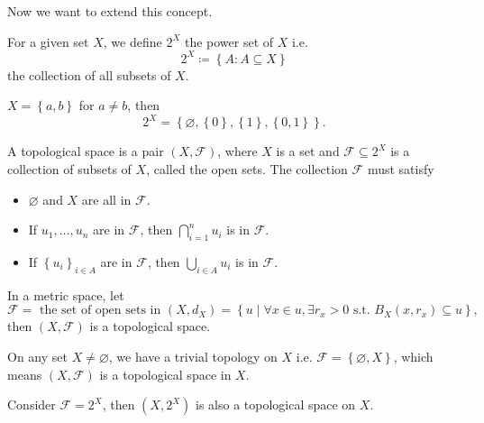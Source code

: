 Now we want to extend this concept. 
\begin{definition} \label{def: power sets}
    For a given set \(X\), we define \(2^X\) the power set of \(X\) i.e. 
    \[
        2^X \coloneqq \left\{ A:A\subseteq X \right\} 
    \] the collection of all subsets of \(X\). 
\end{definition}

\begin{eg}
    \(X = \left\{ a, b \right\} \) for \(a \neq b\), then 
    \[
        2^X = \left\{ \varnothing , \left\{ 0 \right\}, \left\{ 1 \right\}, \left\{ 0, 1 \right\}    \right\}. 
    \]  
\end{eg}

\begin{definition} \label{def: topological space}
    A topological space is a pair \(\left( X, \mathcal{F}  \right) \), where \(X\) is a set and \(\mathcal{F} \subseteq 2^X \) is a collection of subsets of \(X\), called the open sets. The collection \(\mathcal{F} \) must satisfy 
    \begin{itemize}
        \item \(\varnothing  \) and \(X\) are all in \(\mathcal{F} \). 
        \item  If \(u_1, \dots , u_n\) are in \(\mathcal{F} \), then \(\bigcap_{i=1}^{n} u_i \) is in \(\mathcal{F} \). 
        \item If \(\left\{ u_i \right\}_{i \in A} \) are in \(\mathcal{F} \), then \(\bigcup_{i \in A} u_{i} \) is in \(\mathcal{F} \).       
\end{itemize}    
\end{definition}

\begin{remark}
    In a metric space, let 
    \[
        \mathcal{F} = \text{ the set of open sets in } (X, d_X) = \left\{ u \mid \forall x \in u, \exists r_x > 0 \text{ s.t. } B_X(x, r_x) \subseteq u \right\}, 
    \] then \((X, \mathcal{F}) \) is a topological space.  
\end{remark}

\begin{eg}
    On any set \(X \neq \varnothing \), we have a trivial topology on \(X\) i.e. \(\mathcal{F} = \left\{ \varnothing , X \right\} \), which means \((X, \mathcal{F} )\) is a topological space in \(X\).  
\end{eg}

\begin{eg}
    Consider \(\mathcal{F} = 2^X\), then \((X, 2^X)\) is also a topological space on \(X\).    
\end{eg}

